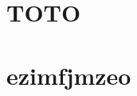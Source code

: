 \documentclass[header]{gdbdg} %
\begin{document}
    \maketitle
    \section{TOTO}
        \blindtext[10][4]
    \newpage
    \section{ezimfjmzeo}
\end{document}
